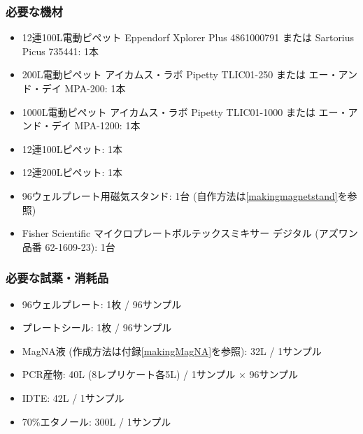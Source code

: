 \documentclass[titlepage,10pt,a4paper,uplatex]{jsbook}
\begin{document}
\subsubsection{必要な機材}
\begin{itemize}
\item 12連100{\textmu}L電動ピペット Eppendorf Xplorer Plus 4861000791 または Sartorius Picus 735441: 1本
\item 200{\textmu}L電動ピペット アイカムス・ラボ Pipetty TLIC01-250 または エー・アンド・デイ MPA-200: 1本
\item 1000{\textmu}L電動ピペット アイカムス・ラボ Pipetty TLIC01-1000 または エー・アンド・デイ MPA-1200: 1本
\item 12連100{\textmu}Lピペット: 1本
\item 12連200{\textmu}Lピペット: 1本
\item 96ウェルプレート用磁気スタンド: 1台 (自作方法は\ref{makingmagnetstand}を参照)
\item Fisher Scientific マイクロプレートボルテックスミキサー デジタル (アズワン品番 62-1609-23): 1台
\end{itemize}

\subsubsection{必要な試薬・消耗品}
\begin{itemize}
\item 96ウェルプレート: 1枚 / 96サンプル
\item プレートシール: 1枚 / 96サンプル
\item MagNA液 (作成方法は付録\ref{makingMagNA}を参照): 32{\textmu}L / 1サンプル
\item PCR産物: 40{\textmu}L (8レプリケート各5{\textmu}L) / 1サンプル × 96サンプル
\item IDTE: 42{\textmu}L / 1サンプル
\item 70\%エタノール: 300{\textmu}L / 1サンプル
\end{itemize}
\end{document}
